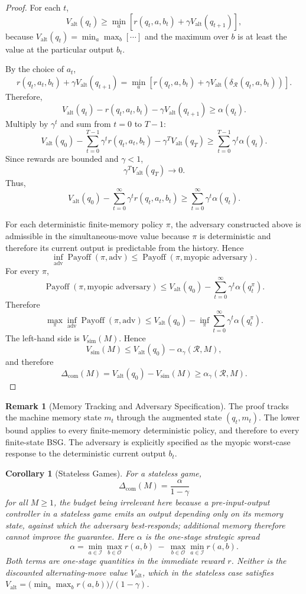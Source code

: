 \documentclass[12pt]{article}
\newtheorem{corollary}[theorem]{Corollary}
\theoremstyle{definition}
\newtheorem{remark}[theorem]{Remark}
\newcommand{\Com}{\Delta_{\mathrm{com}}}
\newcommand{\Valt}{V_{\mathrm{alt}}}
\newcommand{\Vsim}{V_{\mathrm{sim}}}
\begin{document}
\begin{proof}
For each $t$,
\[
\Valt(q_t)
\ge
\min_a
\left[
r(q_t,a,b_t)+\gamma \Valt(q_{t+1})
\right],
\]
because $\Valt(q_t)=\min_a\max_b[\cdots]$ and the maximum over $b$ is at least the
value at the particular output $b_t$.

By the choice of $a_t$,
\[
r(q_t,a_t,b_t)+\gamma \Valt(q_{t+1})
=
\min_a
\left[
r(q_t,a,b_t)+\gamma \Valt(\delta_{\mathcal R}(q_t,a,b_t))
\right].
\]
Therefore,
\[
\Valt(q_t)-r(q_t,a_t,b_t)-\gamma \Valt(q_{t+1})
\ge
\alpha(q_t).
\]
Multiply by $\gamma^t$ and sum from $t=0$ to $T-1$:
\[
\Valt(q_0)
-
\sum_{t=0}^{T-1}\gamma^t r(q_t,a_t,b_t)
-
\gamma^T \Valt(q_T)
\ge
\sum_{t=0}^{T-1}\gamma^t\alpha(q_t).
\]
Since rewards are bounded and $\gamma<1$,
\[
\gamma^T \Valt(q_T)\to0.
\]
Thus,
\[
\Valt(q_0)
-
\sum_{t=0}^{\infty}\gamma^t r(q_t,a_t,b_t)
\ge
\sum_{t=0}^{\infty}\gamma^t\alpha(q_t).
\]

For each deterministic finite-memory policy $\pi$, the adversary constructed
above is admissible in the simultaneous-move value because $\pi$ is
deterministic and therefore its current output is predictable from the
history.  Hence
\[
\inf_{\text{adv}} \operatorname{Payoff}(\pi,\text{adv})
\le
\operatorname{Payoff}(\pi,\text{myopic adversary}).
\]
For every $\pi$,
\[
\operatorname{Payoff}(\pi,\text{myopic adversary})
\le
\Valt(q_0)-\sum_{t=0}^{\infty}\gamma^t\alpha(q_t^\pi).
\]
Therefore
\[
\max_{\pi}
\inf_{\text{adv}} \operatorname{Payoff}(\pi,\text{adv})
\le
\Valt(q_0)
-
\inf_{\pi}
\sum_{t=0}^{\infty}\gamma^t\alpha(q_t^\pi).
\]
The left-hand side is $\Vsim(M)$.  Hence
\[
\Vsim(M)
\le
\Valt(q_0)-\alpha_\gamma(\mathcal R,M),
\]
and therefore
\[
\Com(M)
=
\Valt(q_0)-\Vsim(M)
\ge
\alpha_\gamma(\mathcal R,M).
\]
\end{proof}

\begin{remark}[Memory Tracking and Adversary Specification]
\label{rem:strategic-proof-tracking}
The proof tracks the machine memory state $m_t$ through the augmented state
$(q_t,m_t)$.  The lower bound applies to every finite-memory deterministic
policy, and therefore to every finite-state BSG.  The adversary is explicitly
specified as the myopic worst-case response to the deterministic current
output $b_t$.
\end{remark}

\begin{corollary}[Stateless Games]
\label{cor:stateless}
For a stateless game,
\[
\Com(M)
=
\frac{\alpha}{1-\gamma}
\]
for all $M\ge1$, the budget being irrelevant here because a pre-input-output
controller in a stateless game emits an output depending only on its memory
state, against which the adversary best-responds; additional memory therefore
cannot improve the guarantee.  Here $\alpha$ is the \emph{one-stage} strategic
spread
\[
\alpha
=
\min_{a\in\mathcal I}\max_{b\in\mathcal O}r(a,b)
\ -\
\max_{b\in\mathcal O}\min_{a\in\mathcal I}r(a,b).
\]
Both terms are one-stage quantities in the immediate reward $r$.  Neither is
the discounted alternating-move value $\Valt$, which in the stateless case
satisfies $\Valt=\bigl(\min_a\max_br(a,b)\bigr)/(1-\gamma)$.
\end{corollary}
\end{document}
